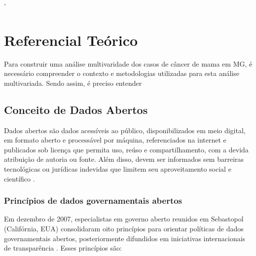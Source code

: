 '   \chapter{Referencial Teórico}

Para construir uma análise multivaridade dos casos de câncer de mama em MG, é necessário compreender o contexto e metodologias utilizadas para esta análise multivariada. Sendo assim, é preciso entender 

\section{Conceito de Dados Abertos}
Dados abertos são dados acessíveis ao público, disponibilizados em meio digital, em formato aberto e processável por máquina, referenciados na internet e publicados sob licença que permita uso, reúso e compartilhamento, com a devida atribuição de autoria ou fonte. Além disso, devem ser informados sem barreiras tecnológicas ou jurídicas indevidas que limitem seu aproveitamento social e científico \cite{enap2016dadosabertos}.

\subsection{Princípios de dados governamentais abertos}

Em dezembro de 2007, especialistas em governo aberto reunidos em Sebastopol (Califórnia, EUA) consolidaram oito princípios para orientar políticas de dados governamentais abertos, posteriormente difundidos em iniciativas internacionais de transparência \cite{lopes2023dadosabertos}. Esses princípios são:

